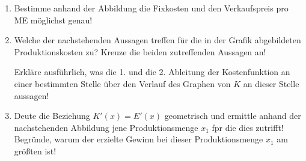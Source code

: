 \begin{langesbeispiel}
\begin{enumerate}
	\item Bestimme anhand der Abbildung die Fixkosten und den Verkaufspreis pro ME möglichst genau!
	
	\item Welche der nachstehenden Aussagen treffen für die in der Grafik abgebildeten Produktionskosten zu? Kreuze die beiden zutreffenden Aussagen an!\leer
	
	\leer
					
					Erkläre ausführlich, was die 1. und die 2. Ableitung der Kostenfunktion an einer bestimmten Stelle über den Verlauf des Graphen von $K$ an dieser Stelle aussagen!
					
					\item Deute die Beziehung $K'(x)=E'(x)$ geometrisch und ermittle anhand der nachstehenden Abbildung jene Produktionsmenge $x_1$ fpr die dies zutrifft! Begründe, warum der erzielte Gewinn bei dieser Produktionsmenge $x_1$ am größten ist!\leer
					

\end{enumerate}
\end{langesbeispiel}

